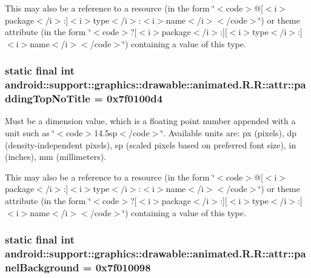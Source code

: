 This may also be a reference to a resource (in the form \char`\"{}$<$code$>$@\mbox{[}$<$i$>$package$<$/i$>$:\mbox{]}$<$i$>$type$<$/i$>$:$<$i$>$name$<$/i$>$$<$/code$>$\char`\"{}) or theme attribute (in the form \char`\"{}$<$code$>$?\mbox{[}$<$i$>$package$<$/i$>$:\mbox{]}\mbox{[}$<$i$>$type$<$/i$>$:\mbox{]}$<$i$>$name$<$/i$>$$<$/code$>$\char`\"{}) containing a value of this type. \hypertarget{classandroid_1_1support_1_1graphics_1_1drawable_1_1animated_1_1_r_1_1attr_d9316675df74084daf59d776a2e07452}{
\subsubsection[{paddingTopNoTitle}]{\setlength{\rightskip}{0pt plus 5cm}static final int android::support::graphics::drawable::animated.R.R::attr::paddingTopNoTitle = 0x7f0100d4}}
\label{classandroid_1_1support_1_1graphics_1_1drawable_1_1animated_1_1_r_1_1attr_d9316675df74084daf59d776a2e07452}


Must be a dimension value, which is a floating point number appended with a unit such as \char`\"{}$<$code$>$14.5sp$<$/code$>$\char`\"{}. Available units are: px (pixels), dp (density-independent pixels), sp (scaled pixels based on preferred font size), in (inches), mm (millimeters). 

This may also be a reference to a resource (in the form \char`\"{}$<$code$>$@\mbox{[}$<$i$>$package$<$/i$>$:\mbox{]}$<$i$>$type$<$/i$>$:$<$i$>$name$<$/i$>$$<$/code$>$\char`\"{}) or theme attribute (in the form \char`\"{}$<$code$>$?\mbox{[}$<$i$>$package$<$/i$>$:\mbox{]}\mbox{[}$<$i$>$type$<$/i$>$:\mbox{]}$<$i$>$name$<$/i$>$$<$/code$>$\char`\"{}) containing a value of this type. \hypertarget{classandroid_1_1support_1_1graphics_1_1drawable_1_1animated_1_1_r_1_1attr_5528036b7de74e7411e0b6bba9bec510}{
\subsubsection[{panelBackground}]{\setlength{\rightskip}{0pt plus 5cm}static final int android::support::graphics::drawable::animated.R.R::attr::panelBackground = 0x7f010098}}
\label{classandroid_1_1support_1_1graphics_1_1drawable_1_1animated_1_1_r_1_1attr_5528036b7de74e7411e0b6bba9bec510}


